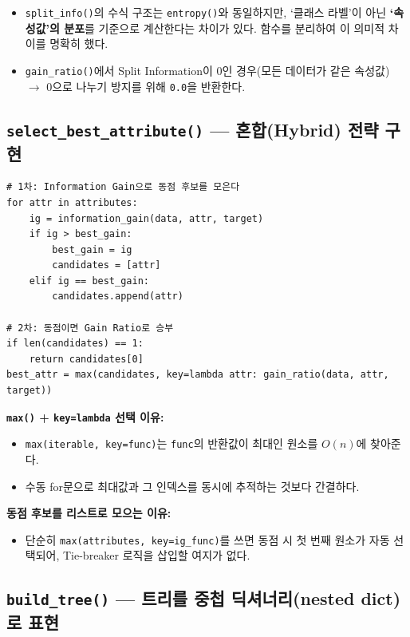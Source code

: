 \documentclass[12pt, a4paper]{article}
\begin{document}
\begin{itemize}
    \item \texttt{split\_info()}의 수식 구조는 \texttt{entropy()}와 동일하지만, `클래스 라벨'이 아닌 \textbf{`속성값'의 분포}를 기준으로 계산한다는 차이가 있다. 함수를 분리하여 이 의미적 차이를 명확히 했다.
    \item \texttt{gain\_ratio()}에서 Split Information이 0인 경우(모든 데이터가 같은 속성값) $\to$ 0으로 나누기 방지를 위해 \texttt{0.0}을 반환한다.
\end{itemize}


\subsection{\texttt{select\_best\_attribute()} --- 혼합(Hybrid) 전략 구현}

\begin{verbatim}
# 1차: Information Gain으로 동점 후보를 모은다
for attr in attributes:
    ig = information_gain(data, attr, target)
    if ig > best_gain:
        best_gain = ig
        candidates = [attr]
    elif ig == best_gain:
        candidates.append(attr)

# 2차: 동점이면 Gain Ratio로 승부
if len(candidates) == 1:
    return candidates[0]
best_attr = max(candidates, key=lambda attr: gain_ratio(data, attr, target))
\end{verbatim}

\noindent\textbf{\texttt{max()} + \texttt{key=lambda} 선택 이유:}
\begin{itemize}
    \item \texttt{max(iterable, key=func)}는 \texttt{func}의 반환값이 최대인 원소를 $O(n)$에 찾아준다.
    \item 수동 for문으로 최대값과 그 인덱스를 동시에 추적하는 것보다 간결하다.
\end{itemize}

\noindent\textbf{동점 후보를 리스트로 모으는 이유:}
\begin{itemize}
    \item 단순히 \texttt{max(attributes, key=ig\_func)}를 쓰면 동점 시 첫 번째 원소가 자동 선택되어, Tie-breaker 로직을 삽입할 여지가 없다.
\end{itemize}


\subsection{\texttt{build\_tree()} --- 트리를 중첩 딕셔너리(nested dict)로 표현}
\end{document}
